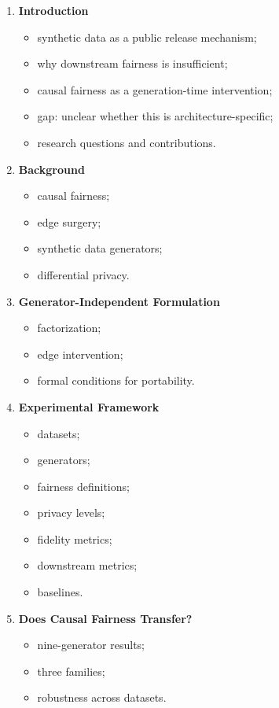 \documentclass[11pt]{article}
\begin{document}
\begin{enumerate}
    \item \textbf{Introduction}
    \begin{itemize}
        \item synthetic data as a public release mechanism;
        \item why downstream fairness is insufficient;
        \item causal fairness as a generation-time intervention;
        \item gap: unclear whether this is architecture-specific;
        \item research questions and contributions.
    \end{itemize}

    \item \textbf{Background}
    \begin{itemize}
        \item causal fairness;
        \item edge surgery;
        \item synthetic data generators;
        \item differential privacy.
    \end{itemize}

    \item \textbf{Generator-Independent Formulation}
    \begin{itemize}
        \item factorization;
        \item edge intervention;
        \item formal conditions for portability.
    \end{itemize}

    \item \textbf{Experimental Framework}
    \begin{itemize}
        \item datasets;
        \item generators;
        \item fairness definitions;
        \item privacy levels;
        \item fidelity metrics;
        \item downstream metrics;
        \item baselines.
    \end{itemize}

    \item \textbf{Does Causal Fairness Transfer?}
    \begin{itemize}
        \item nine-generator results;
        \item three families;
        \item robustness across datasets.
    \end{itemize}


\end{enumerate}
\end{document}
